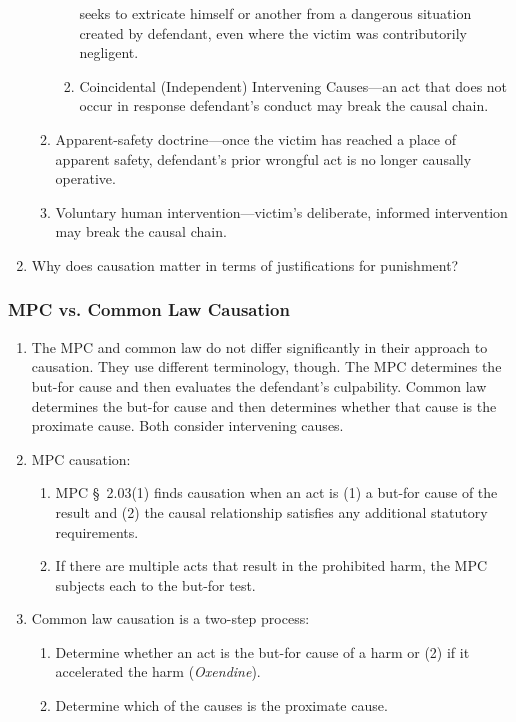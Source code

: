 \begin{enumerate}
\begin{enumerate}
\begin{enumerate}
            seeks to extricate himself or another from a dangerous situation 
            created by defendant, even where the victim was contributorily 
            negligent.
            \item Coincidental (Independent) Intervening Causes---an act that 
            does not occur in response defendant's conduct may break the 
            causal chain.
        \end{enumerate}
        \item Apparent-safety doctrine---once the victim has reached a place 
        of apparent safety, defendant's prior wrongful act is no longer 
        causally operative.
        \item Voluntary human intervention---victim's deliberate, informed 
        intervention may break the causal chain.
    \end{enumerate}
    \item Why does causation matter in terms of justifications for punishment?
\end{enumerate}

\subsubsection{MPC vs. Common Law Causation}

\begin{enumerate}
    \item The MPC and common law do not differ significantly in their approach 
    to causation. They use different terminology, though. The MPC determines 
    the but-for cause and then evaluates the defendant's culpability. Common 
    law determines the but-for cause and then determines whether that cause is 
    the proximate cause. Both consider intervening causes.
    \item MPC causation:
    \begin{enumerate}
        \item MPC \S\ 2.03(1) finds causation when an act is (1) a but-for 
        cause of the result and (2) the causal relationship satisfies any 
        additional statutory requirements.
        \item If there are multiple acts that result in the prohibited harm, 
        the MPC subjects each to the but-for test.
    \end{enumerate}
    \item Common law causation is a two-step process:
    \begin{enumerate}
        \item Determine whether an act is the but-for cause of a harm or (2) 
        if it accelerated the harm (\emph{Oxendine}).
        \item Determine which of the causes is the proximate cause.
    \end{enumerate}
\end{enumerate}

